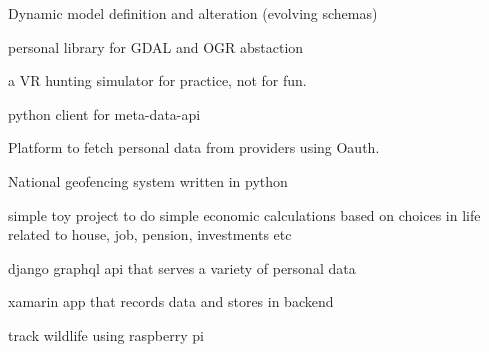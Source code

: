 Dynamic model definition and alteration (evolving schemas)
\divider

personal library for GDAL and OGR abstaction
\divider


\divider

a VR hunting simulator for practice, not for fun.

      
\divider

python client for meta-data-api
 
\divider

Platform to fetch personal data from providers using Oauth.

            
\divider

National geofencing system written in python
\divider


   
\divider

simple toy project to do simple economic calculations based on choices in life related to house, job, pension, investments etc
   
\divider

django graphql api that serves a variety of personal data
    
\divider

xamarin app that records data and stores in backend
\divider


 
\divider

track wildlife using raspberry pi
\divider


    
